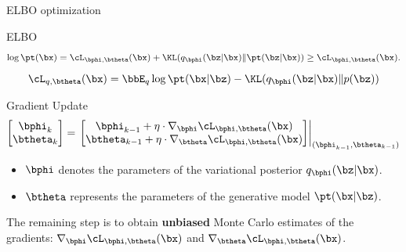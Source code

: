 \documentclass{beamer}
\begin{document}
\begin{frame}{ELBO optimization}
	\begin{block}{ELBO}
		\vspace{-0.3cm}
		\[
			\log \pt(\bx) = \cL_{\bphi, \btheta}(\bx) + \KL(q_{\bphi}(\bz| \bx) \| \pt(\bz|\bx)) \geq \cL_{\bphi, \btheta}(\bx).
		\]
		\[
		 	\cL_{q, \btheta}(\bx) = \bbE_{q} \log \pt(\bx | \bz) - \KL(q_{\bphi}(\bz| \bx) \| p(\bz))
		\]
		\vspace{-0.5cm}
	\end{block}
	\eqpause
	\begin{block}{Gradient Update}
		\[
			\begin{bmatrix}
				\bphi_k \\
				\btheta_k
			\end{bmatrix}
			= \left.
			\begin{bmatrix}
				\bphi_{k-1} + \eta \cdot \nabla_{\bphi} \cL_{\bphi, \btheta}(\bx) \\
				\btheta_{k-1} + \eta \cdot \nabla_{\btheta} \cL_{\bphi, \btheta}(\bx)
			\end{bmatrix}
			\right|_{(\bphi_{k-1}, \btheta_{k-1})}
		\]
		\begin{itemize}
			\item $\bphi$ denotes the parameters of the variational posterior $q_{\bphi}(\bz| \bx)$.
			\item $\btheta$ represents the parameters of the generative model $\pt(\bx | \bz)$.
		\end{itemize}
	\end{block}
	\eqpause
	The remaining step is to obtain \textbf{unbiased} Monte Carlo estimates of the gradients: $\nabla_{\bphi} \cL_{\bphi, \btheta}(\bx)$ and $\nabla_{\btheta} \cL_{\bphi, \btheta}(\bx)$. 
\end{frame}
\end{document}
